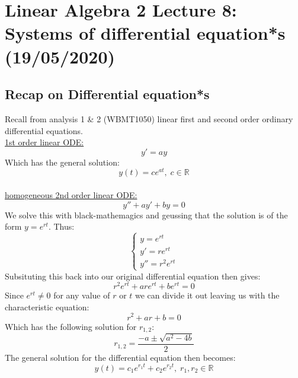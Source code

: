 \documentclass[11pt, a4paper]{article}
\newcommand*{\R}{\ensuremath{\mathbb{R}}}
\begin{document}
\setcounter{section}{7}
\setcounter{equation}{0}

\section{Linear Algebra 2 Lecture 8: Systems of differential equation*s (19/05/2020)}


\subsection{Recap on Differential equation*s}
Recall from analysis 1 \& 2 (WBMT1050) linear first and second order ordinary differential equations.\\
\underline{1st order linear ODE:}
\begin{equation*}
  y' = ay
\end{equation*}
Which has the general solution:
\begin{equation*}
  y(t) = ce^{at},\; c \in \R
\end{equation*}\\
\underline{homogeneous 2nd order linear ODE:}
\begin{equation*}
  y'' + ay' + by = 0
\end{equation*}
We solve this with black-mathemagics and geussing that the solution is of the form $y=e^{rt}$. Thus:
\begin{equation*}
  \begin{cases}
    y = e^{rt}\\
    y' = re^{rt}\\
    y'' = r^2e^{rt}
  \end{cases}
\end{equation*}
Subsituting this back into our original differential equation then gives:
\begin{equation*}
  r^2e^{rt} + are^{rt} + be^{rt} = 0
\end{equation*}
Since $e^{rt}\neq 0$ for any value of $r$ or $t$ we can divide it out leaving us with the characteristic equation:
\begin{equation*}
  r^2 + ar + b = 0
\end{equation*} 
Which has the following solution for $r_{1,2}$:
\begin{equation*}
  r_{1,2} = \frac{-a \pm \sqrt{a^2 - 4b}}{2}
\end{equation*}
The general solution for the differential equation then becomes:
\begin{equation*}
  y(t) = c_1e^{r_1t} + c_2e^{r_2t}, \; r_1, r_2 \in \R
\end{equation*}
\end{document}
